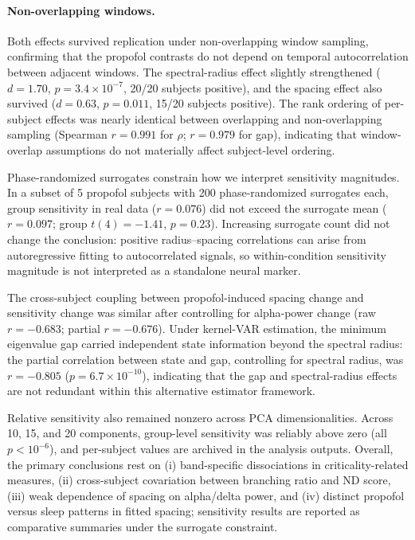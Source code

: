 \documentclass[preprint,12pt,nonatbib]{elsarticle}
\begin{document}
\paragraph{Non-overlapping windows.} Both effects survived replication under non-overlapping window sampling, confirming that the propofol contrasts do not depend on temporal autocorrelation between adjacent windows. The spectral-radius effect slightly strengthened ($d = 1.70$, $p = 3.4 \times 10^{-7}$, 20/20 subjects positive), and the spacing effect also survived ($d = 0.63$, $p = 0.011$, 15/20 subjects positive). The rank ordering of per-subject effects was nearly identical between overlapping and non-overlapping sampling (Spearman $r = 0.991$ for $\rho$; $r = 0.979$ for gap), indicating that window-overlap assumptions do not materially affect subject-level ordering.

Phase-randomized surrogates constrain how we interpret sensitivity magnitudes. In a subset of 5 propofol subjects with 200 phase-randomized surrogates each, group sensitivity in real data ($r=0.076$) did not exceed the surrogate mean ($r=0.097$; group $t(4)=-1.41$, $p=0.23$). Increasing surrogate count did not change the conclusion: positive radius--spacing correlations can arise from autoregressive fitting to autocorrelated signals, so within-condition sensitivity magnitude is not interpreted as a standalone neural marker.

The cross-subject coupling between propofol-induced spacing change and sensitivity change was similar after controlling for alpha-power change (raw $r=-0.683$; partial $r=-0.676$). Under kernel-VAR estimation, the minimum eigenvalue gap carried independent state information beyond the spectral radius: the partial correlation between state and gap, controlling for spectral radius, was $r = -0.805$ ($p = 6.7 \times 10^{-10}$), indicating that the gap and spectral-radius effects are not redundant within this alternative estimator framework.

Relative sensitivity also remained nonzero across PCA dimensionalities. Across 10, 15, and 20 components, group-level sensitivity was reliably above zero (all $p<10^{-6}$), and per-subject values are archived in the analysis outputs. Overall, the primary conclusions rest on (i) band-specific dissociations in criticality-related measures, (ii) cross-subject covariation between branching ratio and ND score, (iii) weak dependence of spacing on alpha/delta power, and (iv) distinct propofol versus sleep patterns in fitted spacing; sensitivity results are reported as comparative summaries under the surrogate constraint.
\end{document}
